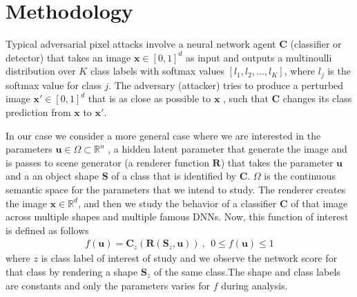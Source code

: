 \section{Methodology} \label{sec:methodology}
Typical adversarial pixel attacks involve a neural network agent $\mathbf{C}$ (\eg classifier or detector) that takes an image $\mathbf{x} \in [0,1]^{d}$ as input and outputs a multinoulli distribution over $K$ class labels with softmax values $[l_{1}, l_{2}, ... ,l_{K}]$, where $l_{j}$ is the softmax value for class $j$. The adversary (attacker) tries to produce a perturbed image $\mathbf{x'} \in [0,1]^{d}$ that is as close as possible to $\mathbf{x}$ , such that $\mathbf{C}$ changes its class prediction from $\mathbf{x}$ to $\mathbf{x'}$. %


    In our case we consider a more general case where we are interested in the parameters $\mathbf{u} \in \Omega \subset \mathbb{R}^{n}$ , a hidden latent parameter that generate the image and is passes to scene generator (\eg a renderer function $\mathbf{R}$) that takes the parameter $\mathbf{u}$ and a an object shape $\mathbf{S}$ of a class that is identified by $\mathbf{C}$. $\Omega$ is the continuous semantic space for the parameters that we intend to study. The renderer creates the image $\mathbf{x} \in \mathbb{R}^{d}$, and then we study the behavior of a classifier $\mathbf{C}$ of that image across multiple shapes and multiple famous DNNs. Now, this function of interest is defined as follows 
    \begin{equation}
\begin{aligned} 
 f(\mathbf{u}) = \mathbf{C}_{z}(\mathbf{R}(\mathbf{S}_{z},\mathbf{u})) ~, ~~ 0\leq  f(\mathbf{u}) \leq 1
\label{eq:f}
\end{aligned}
\end{equation}
where $z$ is class label of interest of study and we observe the network score for that class by rendering a shape $\mathbf{S}_{z}$ of the same class.The shape and class labels are constants and only the parameters varies for $f$ during analysis. 

